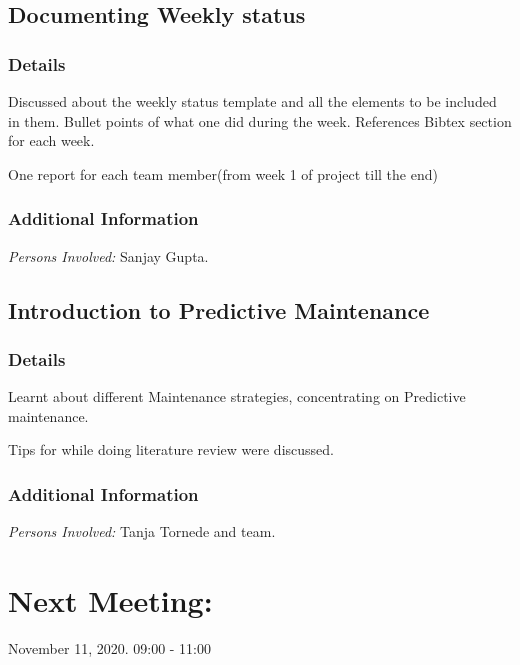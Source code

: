 \documentclass{meetingmins}
\begin{document}
\subsection{Documenting Weekly status}
        \subsubsection{Details}
        \begin{hiddensubitems}
            \item
                Discussed about the weekly status template and all the elements to be included in them.
                \subitem Bullet points of what one did during the week. 
	            \subitem References Bibtex section for each week. 
	       \item 
	            One report for each team member(from week 1 of project till the end)
        \end{hiddensubitems}
        \subsubsection{Additional Information}
        \begin{hiddensubitems}
            \item
                \textit{Persons Involved: } Sanjay Gupta.
        \end{hiddensubitems}        

\subsection{Introduction to Predictive Maintenance}
        \subsubsection{Details}
        \begin{hiddensubitems}
            \item
                Learnt about different Maintenance strategies, concentrating on Predictive maintenance.
            \item
                Tips for while doing literature review were discussed.    
        \end{hiddensubitems}
        \subsubsection{Additional Information}
        \begin{hiddensubitems}
            \item
                \textit{Persons Involved: } Tanja Tornede and team.
        \end{hiddensubitems}

\section{Next Meeting:} November 11, 2020. 09:00 - 11:00
\end{document}
